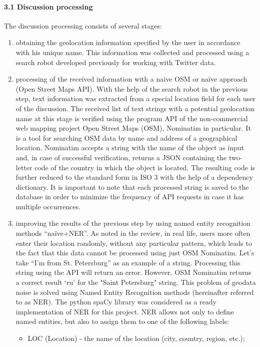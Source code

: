 \paragraph{3.1 Discussion processing} The discussion processing consists of several stages:
\begin{enumerate}
	\item obtaining the geolocation information specified by the user in accordance with his unique name. This information was collected and processed using a search robot developed previously for working with Twitter data.
	\item processing of the received information with a naive OSM or naïve approach (Open Street Maps API). With the help of the search robot in the previous step, text information was extracted from a special location field for each user of the discussion. The received list of text strings with a potential geolocation name at this stage is verified using the program API of the non-commercial web mapping project Open Street Maps (OSM), Nominatim in particular. It is a tool for searching OSM data by name and address of a geographical location. Nominatim accepts a string with the name of the object as input and, in case of successful verification, returns a JSON containing the two-letter code of the country in which the object is located. The resulting code is further reduced to the standard form in ISO 3 with the help of a dependency dictionary. It is important to note that each processed string is saved to the database in order to minimize the frequency of API requests in case it has multiple occurrences.
	\item improving the results of the previous step by using named entity recognition methods “naïve+NER”. As noted in the review, in real life, users more often enter their location randomly, without any particular pattern, which leads to the fact that this data cannot be processed using just OSM Nominatim. Let's take “I'm from St. Petersburg” as an example of a string. Processing this string using the API will return an error. However, OSM Nominatim returns a correct result ‘ru’ for the "Saint Petersburg" string. This problem of geodata noise is solved using Named Entity Recognition methods (hereinafter referred to as NER). The python spaCy library was considered as a ready implementation of NER for this project. NER allows not only to define named entities, but also to assign them to one of the following labels:
	\begin{itemize}
		\item LOC (Location) - the name of the location (city, country, region, etc.);

\end{itemize}
\end{enumerate}

